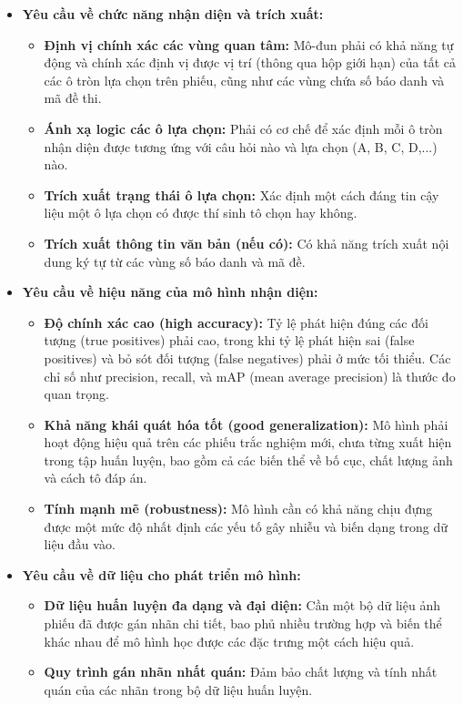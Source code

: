 \begin{itemize}
    \item \textbf{Yêu cầu về chức năng nhận diện và trích xuất:}
    \begin{itemize}
        \item \textbf{Định vị chính xác các vùng quan tâm:} Mô-đun phải có khả năng tự động và chính xác định vị được vị trí (thông qua hộp giới hạn) của tất cả các ô tròn lựa chọn trên phiếu, cũng như các vùng chứa số báo danh và mã đề thi.
        \item \textbf{Ánh xạ logic các ô lựa chọn:} Phải có cơ chế để xác định mỗi ô tròn nhận diện được tương ứng với câu hỏi nào và lựa chọn (A, B, C, D,...) nào.
        \item \textbf{Trích xuất trạng thái ô lựa chọn:} Xác định một cách đáng tin cậy liệu một ô lựa chọn có được thí sinh tô chọn hay không.
        \item \textbf{Trích xuất thông tin văn bản (nếu có):} Có khả năng trích xuất nội dung ký tự từ các vùng số báo danh và mã đề.
    \end{itemize}

    \item \textbf{Yêu cầu về hiệu năng của mô hình nhận diện:}
    \begin{itemize}
        \item \textbf{Độ chính xác cao (high accuracy):} Tỷ lệ phát hiện đúng các đối tượng (true positives) phải cao, trong khi tỷ lệ phát hiện sai (false positives) và bỏ sót đối tượng (false negatives) phải ở mức tối thiểu. Các chỉ số như precision, recall, và mAP (mean average precision) là thước đo quan trọng.
        \item \textbf{Khả năng khái quát hóa tốt (good generalization):} Mô hình phải hoạt động hiệu quả trên các phiếu trắc nghiệm mới, chưa từng xuất hiện trong tập huấn luyện, bao gồm cả các biến thể về bố cục, chất lượng ảnh và cách tô đáp án.
        \item \textbf{Tính mạnh mẽ (robustness):} Mô hình cần có khả năng chịu đựng được một mức độ nhất định các yếu tố gây nhiễu và biến dạng trong dữ liệu đầu vào.
    \end{itemize}

    \item \textbf{Yêu cầu về dữ liệu cho phát triển mô hình:}
    \begin{itemize}
        \item \textbf{Dữ liệu huấn luyện đa dạng và đại diện:} Cần một bộ dữ liệu ảnh phiếu đã được gán nhãn chi tiết, bao phủ nhiều trường hợp và biến thể khác nhau để mô hình học được các đặc trưng một cách hiệu quả.
        \item \textbf{Quy trình gán nhãn nhất quán:} Đảm bảo chất lượng và tính nhất quán của các nhãn trong bộ dữ liệu huấn luyện.
    \end{itemize}
\end{itemize}

